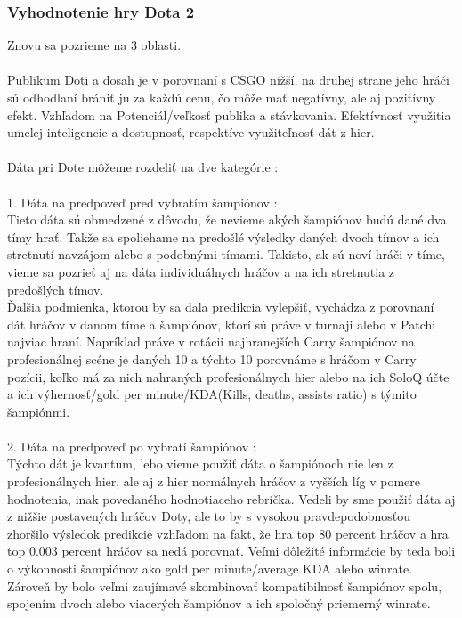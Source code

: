 \subsubsection{Vyhodnotenie hry Dota 2}
Znovu sa pozrieme na 3 oblasti. \\ \\ 
Publikum Doti a dosah je v porovnaní s CSGO nižší, na druhej strane jeho hráči sú odhodlaní brániť ju za každú cenu, čo môže mať negatívny, ale aj pozitívny efekt. Vzhľadom na  Potenciál/veľkosť publika a stávkovania. Efektívnosť využitia umelej inteligencie a dostupnosť, respektíve využiteľnosť dát z hier.
\\ \\
Dáta pri Dote môžeme rozdeliť na dve kategórie : 
\\ \\
1. Dáta na predpoveď pred vybratím šampiónov : \\
Tieto dáta sú obmedzené z dôvodu, že nevieme akých šampiónov budú dané dva tímy hrať. Takže sa spoliehame na predošlé výsledky daných dvoch tímov a ich stretnutí navzájom alebo s podobnými tímami. Takisto, ak sú noví hráči v tíme, vieme sa pozrieť aj na dáta individuálnych hráčov a na ich stretnutia z predošlých tímov. \\
Ďalšia podmienka, ktorou by sa dala predikcia vylepšiť, vychádza z porovnaní dát hráčov v danom tíme a šampiónov, ktorí sú práve v turnaji alebo v Patchi najviac hraní. Napríklad práve v rotácii najhranejších Carry šampiónov na profesionálnej scéne je daných 10 a týchto 10 porovnáme s hráčom v Carry pozícii, koľko má za nich nahraných profesionálnych hier alebo na ich SoloQ účte a ich výhernosť/gold per minute/KDA(Kills, deaths, assists ratio) s týmito šampiónmi.  
\\ \\
2. Dáta na predpoveď po vybratí šampiónov : \\
Týchto dát je kvantum, lebo vieme použiť dáta o šampiónoch nie len z profesionálnych hier, ale aj z hier normálnych hráčov z vyšších líg v pomere hodnotenia, inak povedaného hodnotiaceho rebríčka. Vedeli by sme použiť dáta aj z nižšie postavených hráčov Doty, ale to by s vysokou pravdepodobnosťou zhoršilo výsledok predikcie vzhľadom na fakt, že hra top 80 percent hráčov a hra top 0.003 percent hráčov sa nedá porovnať. Veľmi dôležité informácie by teda boli o výkonnosti šampiónov ako gold per minute/average KDA alebo winrate. Zároveň by bolo veľmi zaujímavé skombinovať kompatibilnosť šampiónov spolu, spojením dvoch alebo viacerých šampiónov a ich spoločný priemerný winrate.


